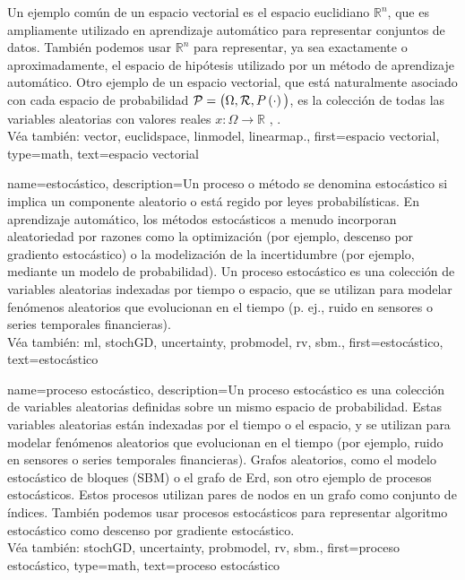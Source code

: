{{    Un ejemplo común de un espacio vectorial es el espacio euclidiano $\mathbb{R}^n$, que es 
    ampliamente utilizado en aprendizaje automático para representar conjuntos de datos. También podemos usar $\mathbb{R}^n$ 
    para representar, ya sea exactamente o aproximadamente, el espacio de hipótesis utilizado por un método de aprendizaje automático. 
    Otro ejemplo de un espacio vectorial, que está naturalmente asociado con cada espacio de probabilidad
    $\mathcal{P}=\big(\Omega,\mathcal{R},P\left(\cdot\right) \big)$, es la colección de todas 
    las variables aleatorias con valores reales $x: \Omega \rightarrow \mathbb{R}$ \cite{RudinBook}, \cite{folland1999real}.  
    \\
    Véa también: \gls{vector}, \gls{euclidspace}, \gls{linmodel}, \gls{linearmap}.},
  first={espacio vectorial},
  type=math,
  text={espacio vectorial}
}


{name={estocástico},
	description={Un proceso o método se denomina estocástico si implica 
		un componente aleatorio o está regido por leyes probabilísticas. En aprendizaje automático, los métodos 
		estocásticos a menudo incorporan aleatoriedad por razones como la optimización (por ejemplo, 
		descenso por gradiento estocástico) o la modelización de la incertidumbre (por ejemplo, mediante 
		un modelo de probabilidad). Un proceso estocástico es una colección de variables aleatorias indexadas por tiempo 
		o espacio, que se utilizan para modelar fenómenos aleatorios que evolucionan en el tiempo 
		(p. ej., ruido en sensores o series temporales financieras).\\
		Véa también: \gls{ml}, \gls{stochGD}, \gls{uncertainty}, \gls{probmodel}, \gls{rv}, \gls{sbm}.},
	first={estocástico},
	text={estocástico}
}

{name={proceso estocástico},
	description={Un proceso estocástico es una colección de variables aleatorias definidas sobre un mismo espacio de probabilidad. 
		Estas variables aleatorias están indexadas por el tiempo o el espacio, y se utilizan para modelar fenómenos aleatorios
		que evolucionan en el tiempo (por ejemplo, ruido en sensores o series temporales financieras). 
		Grafos aleatorios, como el modelo estocástico de bloques (SBM) o el grafo de Erd, son otro ejemplo de procesos estocásticos. 
		Estos procesos utilizan pares de nodos en un grafo como conjunto de índices. 
		También podemos usar procesos estocásticos para representar algoritmo estocástico como descenso por gradiente estocástico.
		\\
		Véa también: \gls{stochGD}, \gls{uncertainty}, \gls{probmodel}, \gls{rv}, \gls{sbm}.},
	first={proceso estocástico},
	type=math,
	text={proceso estocástico}
}


